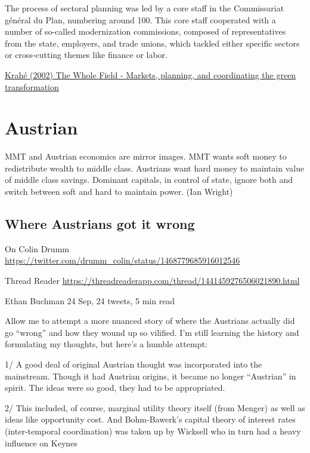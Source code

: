 \documentclass[
]{book}
\begin{document}
The process of sectoral planning was led by a core staff in the Commissariat général du Plan, numbering around 100. This core staff cooperated with a number of so-called modernization commissions, composed of representatives from the state, employers, and trade unions, which tackled either specific sectors or cross-cutting themes like finance or labor.

\href{https://www.phenomenalworld.org/analysis/climate-planning/}{Krahé (2002) The Whole Field - Markets, planning, and coordinating the green transformation}

\hypertarget{austrian}{%
\chapter{Austrian}\label{austrian}}

MMT and Austrian economics are mirror images. MMT wants soft money to redistribute wealth to middle class. Austrians want hard money to maintain value of middle class savings. Dominant capitals, in control of state, ignore both and switch between soft and hard to maintain power.
(Ian Wright)

\hypertarget{where-austrians-got-it-wrong}{%
\section{Where Austrians got it wrong}\label{where-austrians-got-it-wrong}}

On Colin Drumm
\url{https://twitter.com/drumm_colin/status/1468779685916012546}

Thread Reader
\url{https://threadreaderapp.com/thread/1441459276506021890.html}

Ethan Buchman
24 Sep, 24 tweets, 5 min read

Allow me to attempt a more nuanced story of where the Austrians actually did go ``wrong'' and how they wound up so vilified. I'm still learning the history and formulating my thoughts, but here's a humble attempt:

1/ A good deal of original Austrian thought was incorporated into the mainstream. Though it had Austrian origins, it became no longer ``Austrian'' in spirit. The ideas were so good, they had to be appropriated.

2/ This included, of course, marginal utility theory itself (from Menger) as well as ideas like opportunity cost. And Bohm-Bawerk's capital theory of interest rates (inter-temporal coordination) was taken up by Wicksell who in turn had a heavy influence on Keynes
\end{document}
